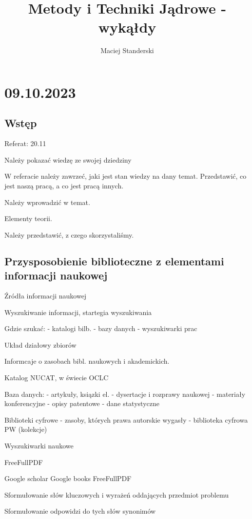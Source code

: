 \documentclass{article}
\title{Metody i Techniki Jądrowe - wykąłdy}
\author{Maciej Standerski}
\begin{document}
\maketitle

\section{09.10.2023}


\subsection{Wstęp}

Referat: 20.11

Należy pokazać wiedzę ze swojej dziedziny

W referacie należy zawrzeć, jaki jest stan wiedzy na dany temat. Przedstawić, co jest naszą pracą, a co jest pracą innych.

Należy wprowadzić w temat.

Elementy teorii.

Należy przedstawić, z czego skorzystaliśmy.

\subsection{Przysposobienie biblioteczne z elementami informacji naukowej}

Źródła informacji naukowej

Wyszukiwanie informacji, startegia wyszukiwania

Gdzie szukać:
- katalogi bilb.
- bazy danych
- wyszukiwarki prac

Układ działowy zbiorów

Informcaje o zasobach bibl. naukowych i akademickich.

Katalog NUCAT, w świecie OCLC

Baza danych:
- artykuły, ksiązki el.
- dysertacje i rozprawy naukowej
- materiały konferencyjne
- opisy patentowe
- dane statystyczne

Biblioteki cyfrowe
- zasoby, których prawa autorskie wygasły
- biblioteka cyfrowa PW (kolekcje)

Wyszukiwarki naukowe

FreeFullPDF

Google scholar
Google books
FreeFullPDF

Sformułowanie słów kluczowych i wyrażeń oddających przedmiot problemu

Sformułowanie odpowidzi do tych słów synonimów
\end{document}
